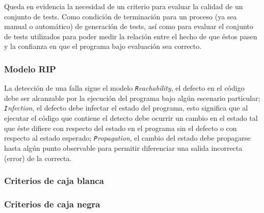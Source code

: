 Queda en evidencia la necesidad de un criterio para evaluar la calidad de un conjunto de tests. Como condici\'on de terminaci\'on para un proceso (ya sea manual o autom\'atico) de generaci\'on de tests, as\'i como para evaluar el conjunto de tests utilizados para poder medir la relaci\'on entre el hecho de que \'estos pasen y la confianza en que el programa bajo evaluaci\'on sea correcto.

\subsubsection{Modelo RIP}

La detecci\'on de una falla sigue el modelo \emph{\texttt{R}eachability}, el defecto en el c\'odigo debe ser alcanzable por la ejecuci\'on del programa bajo alg\'un escenario particular; \emph{\texttt{I}nfection}, el defecto debe infectar el estado del programa, esto significa que al ejecutar el c\'odigo que contiene el detecto debe ocurrir un cambio en el estado tal que \'este difiere con respecto del estado en el programa sin el defecto o con respecto al estado esperado; \emph{\texttt{P}ropagation}, el cambio del estado debe propagarse hasta alg\'un punto observable para permitir diferenciar una salida incorrecta (error) de la correcta.

\subsubsection{Criterios de caja blanca}

\subsubsection{Criterios de caja negra}